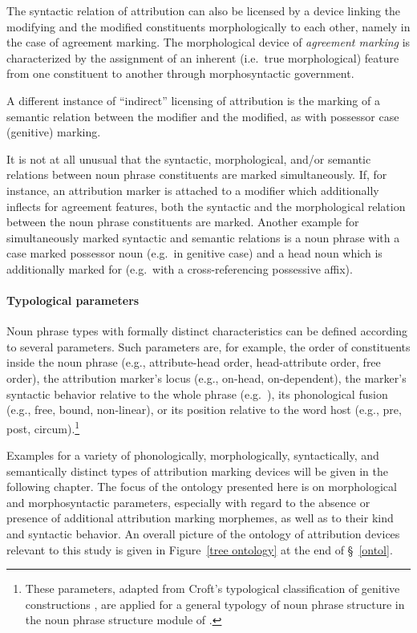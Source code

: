 The syntactic relation of attribution can also be licensed by a device linking the modifying and the modified constituents morphologically to each other, namely in the case of agreement marking. The morphological device of \emph{agreement marking} is characterized by the assignment of an inherent (i.e.~true morphological) feature from one constituent to another through morphosyntactic government.

A different instance of “indirect” licensing of attribution is the marking of a semantic relation between the modifier and the modified, as with possessor case (genitive) marking.

It is not at all unusual that the syntactic, morphological, and/or semantic relations between noun phrase constituents are marked simultaneously. If, for instance, an attribution marker is attached to a modifier which additionally inflects for agreement features, both the syntactic and the morphological relation between the noun phrase constituents are marked. Another example for simultaneously marked syntactic and semantic relations is a noun phrase with a case marked possessor noun (e.g.~in genitive case) and a head noun which is additionally marked for  (e.g.~with a cross-referencing possessive affix).

\paragraph{Typological parameters} 
Noun phrase types with formally distinct characteristics can be defined according to several parameters. Such parameters are, for example, the order of constituents inside the noun phrase (e.g., attribute-head order, head-attribute order, free order), the attribution marker's locus (e.g., on-head, on-dependent), the marker's syntactic behavior relative to the whole phrase (e.g.~), its phonological fusion (e.g., free, bound, non-linear), or its position relative to the word host (e.g., pre, post, circum).\footnote{These parameters, adapted from Croft's typological classification of genitive constructions \citep[93–94]{croft1995}, are applied for a general typology of noun phrase structure in the noun phrase structure module of  \citep[cf.][]{AUTOTYP-NP}.}

Examples for a variety of phonologically, morphologically, syntactically, and semantically distinct types of attribution marking devices will be given in the following chapter. The focus of the ontology presented here is on morphological and morphosyntactic parameters, especially with regard to the absence or presence of additional attribution marking morphemes, as well as to their kind and syntactic behavior. An overall picture of the ontology of attribution devices relevant to this study is given in Figure~\ref{tree ontology} at the end of \S~\ref{ontol}.


